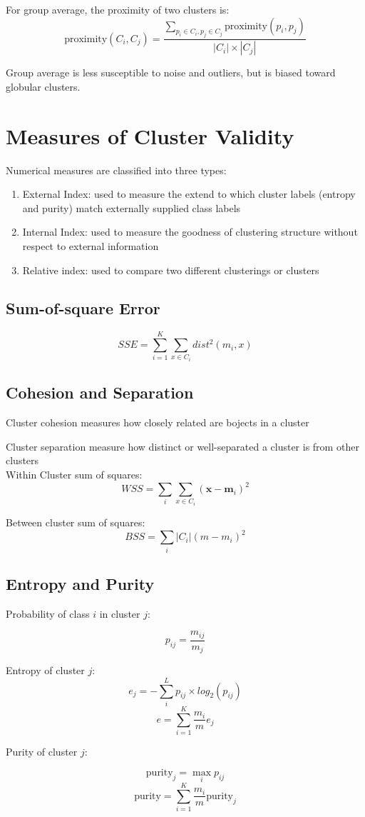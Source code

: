 \begin{multicols*}{2}
\noindent For group average, the proximity of two clusters is:
$$\text{proximity}(C_i, C_j) = \frac{\sum_{p_i \in C_i, p_j \in C_j} \text{proximity}(p_i,p_j)}{|C_i|\times|C_j|}$$

\noindent Group average is less susceptible to noise and outliers, but is biased toward globular clusters. 

\section{Measures of Cluster Validity}

\noindent Numerical measures are classified into three types:

\begin{enumerate}
    \item External Index: used to measure the extend to which cluster labels (entropy and purity) match externally supplied class labels
    \item Internal Index: used to measure the goodness of clustering structure without respect to external information
    \item Relative index: used to compare two different clusterings or clusters
\end{enumerate}

\subsection{Sum-of-square Error}

$$SSE=\sum_{i=1}^K \sum_{x \in C_i} dist^2 (m_i,x)$$

\subsection{Cohesion and Separation}

\noindent Cluster cohesion measures how closely related are bojects in a cluster

\noindent Cluster separation measure how distinct or well-separated a cluster is from other clusters \\

\noindent Within Cluster sum of squares:
$$WSS=\sum_i \sum_{x \in C_i} (\mathbf{x}-\mathbf{m}_i)^2$$

\noindent Between cluster sum of squares:
$$BSS=\sum_i |C_i| (m-m_i)^2$$

\subsection{Entropy and Purity}

\noindent Probability of class $i$ in cluster $j$:

$$p_{ij} = \frac{m_{ij}}{m_j}$$

\noindent Entropy of cluster $j$:
$$e_j = - \sum_{i}^{L} p_{ij} \times log_2 (p_{ij})$$
$$e = \sum_{i=1}^K \frac{m_i}{m} e_j$$

\noindent Purity of cluster $j$:

$$\text{purity}_j= \!\max_i p_{ij}$$
$$\text{purity} = \sum_{i=1}^K \frac{m_i}{m}\text{purity}_j$$

\end{multicols*}
